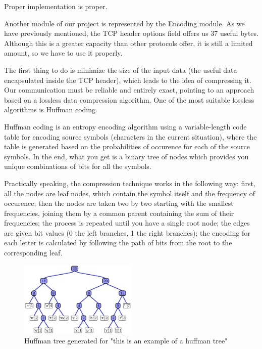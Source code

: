 
Proper implementation is proper.

Another module of our project is represented by the Encoding module. As we
have previously mentioned, the TCP header options field offers us 37 useful
bytes. Although this is a greater capacity than other protocols offer, it is
still a limited amount, so we have to use it properly.

The first thing to do is minimize the size of the input data (the useful
data encapsulated inside the TCP header), which leads to the idea of compressing
it. Our communication must be reliable and entirely exact, pointing to an
approach based on a lossless data compression algorithm. One of the most
suitable lossless algorithms is Huffman coding.

Huffman coding\cite{huffman1952method} is an entropy encoding algorithm using
a variable-length code table for encoding source symbols (characters in the
current situation), where the table is generated based on the probabilities of
occurence for each of the source symbols. In the end, what you get is a binary
tree of nodes which provides you unique combinations of bits for all the
symbols.

Practically speaking, the compression technique works in the following way:
first, all the nodes are leaf nodes, which contain the symbol itself and the
frequency of occurence; then the nodes are taken two by two starting with the
smallest frequencies, joining them by a common parent containing the sum of
their frequencies; the process is repeated until you have a single root node;
the edges are given bit values (0 the left branches, 1 the right branches);
the encoding for each letter is calculated by following the path of bits from
the root to the corresponding leaf.

\begin{figure}
  \centering
  \includegraphics[width=0.5\textwidth]{img/huffman}
  \caption{Huffman tree generated for "this is an example of a huffman tree"}
  \label{fig:huffman}
\end{figure}

